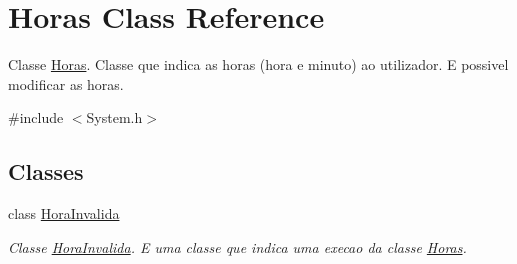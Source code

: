 \hypertarget{class_horas}{}\section{Horas Class Reference}
\label{class_horas}


Classe \hyperlink{class_horas}{Horas}. Classe que indica as horas (hora e minuto) ao utilizador. E possivel modificar as horas.  




{\ttfamily \#include $<$System.\+h$>$}

\subsection*{Classes}
\begin{DoxyCompactItemize}
\item 
class \hyperlink{class_horas_1_1_hora_invalida}{Hora\+Invalida}
\begin{DoxyCompactList}\small\item\em Classe \hyperlink{class_horas_1_1_hora_invalida}{Hora\+Invalida}. E uma classe que indica uma execao da classe \hyperlink{class_horas}{Horas}. \end{DoxyCompactList}\end{DoxyCompactItemize}
